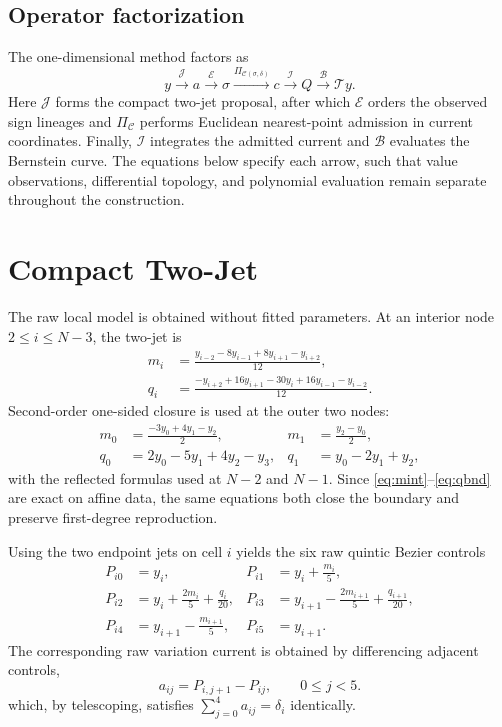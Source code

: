 \documentclass[journal]{IEEEtran}
\newcommand{\Tcal}{\mathcal{T}}
\newcommand{\Ccal}{\mathcal{C}}
\begin{document}
\subsection{Operator factorization}

The one-dimensional method factors as
\begin{equation}
 y\xrightarrow{\mathcal J}a
 \xrightarrow{\mathcal E}\sigma
 \xrightarrow{\Pi_{\Ccal(\sigma,\delta)}}c
 \xrightarrow{\mathcal I}Q
 \xrightarrow{\mathcal B}\Tcal y.
 \label{eq:pipeline}
\end{equation}
Here \(\mathcal J\) forms the compact two-jet proposal, after which
\(\mathcal E\) orders the observed sign lineages and \(\Pi_{\Ccal}\)
performs Euclidean nearest-point admission in current coordinates. Finally,
\(\mathcal I\) integrates the admitted current and \(\mathcal B\) evaluates
the Bernstein curve. The equations below specify each arrow, such that value
observations, differential topology, and polynomial evaluation remain
separate throughout the construction.

\section{Compact Two-Jet}

The raw local model is obtained without fitted parameters. At an interior
node \(2\leq i\leq N-3\), the two-jet is
\begin{align}
 m_i&=\frac{y_{i-2}-8y_{i-1}+8y_{i+1}-y_{i+2}}{12}, \label{eq:mint}\\
 q_i&=\frac{-y_{i+2}+16y_{i+1}-30y_i+16y_{i-1}-y_{i-2}}{12}.
 \label{eq:qint}
\end{align}
Second-order one-sided closure is used at the outer two nodes:
\begin{align}
 m_0&=\frac{-3y_0+4y_1-y_2}{2},&
 m_1&=\frac{y_2-y_0}{2}, \label{eq:mbnd}\\
 q_0&=2y_0-5y_1+4y_2-y_3,&
 q_1&=y_0-2y_1+y_2, \label{eq:qbnd}
\end{align}
with the reflected formulas used at \(N-2\) and \(N-1\). Since
\eqref{eq:mint}--\eqref{eq:qbnd} are exact on affine data, the same equations
both close the boundary and preserve first-degree reproduction.

Using the two endpoint jets on cell \(i\) yields the six raw quintic Bezier
controls
\begin{align}
 P_{i0}&=y_i,&
 P_{i1}&=y_i+\frac{m_i}{5}, \nonumber\\
 P_{i2}&=y_i+\frac{2m_i}{5}+\frac{q_i}{20},&
 P_{i3}&=y_{i+1}-\frac{2m_{i+1}}{5}+\frac{q_{i+1}}{20}, \label{eq:controls}\\
 P_{i4}&=y_{i+1}-\frac{m_{i+1}}{5},&
 P_{i5}&=y_{i+1}. \nonumber
\end{align}
The corresponding raw variation current is obtained by differencing adjacent
controls,
\begin{equation}
  a_{ij}=P_{i,j+1}-P_{ij},\qquad 0\leq j<5.
  \label{eq:rawcurrent}
\end{equation}
which, by telescoping, satisfies
\(\sum_{j=0}^{4}a_{ij}=\delta_i\) identically.
\end{document}
